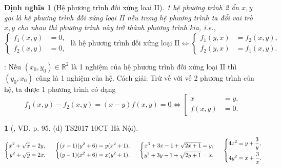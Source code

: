 \documentclass{article}
\newtheorem{baitoan}{}
\newtheorem{dinhnghia}{Định nghĩa}
\begin{document}
\begin{dinhnghia}[Hệ phương trình đối xứng loại II]
	1 hệ phương trình 2 ẩn $x,y$ gọi là {hệ phương trình đối xứng loại II} nếu trong hệ phương trình ta đổi vai trò $x,y$ cho nhau thì phương trình này trở thành phương trình kia, i.e.,
	\begin{equation*}
		\left\{\begin{split}
			f_1(x,y) &= 0,\\
			f_2(x,y) &= 0,
		\end{split}\right.\mbox{ là hệ phương trình đối xứng loại II}\Leftrightarrow\left\{\begin{split}
			f_1(y,x) &= f_2(x,y),\\
			f_2(y,x) &= f_1(x,y).
		\end{split}\right.
	\end{equation*}
\end{dinhnghia}
: Nếu $(x_0,y_0)\in\mathbb{R}^2$ là 1 nghiệm của hệ phương trình đối xứng loại II thì $(y_0,x_0)$ cũng là 1 nghiệm của hệ. {\sf Cách giải}: Trừ vế với vế 2 phương trình của hệ, ta được 1 phương trình có dạng
\begin{equation*}
	f_1(x,y) - f_2(x,y) = (x - y)f(x,y) = 0\Leftrightarrow\left[\begin{split}
		x &= y,\\
		f(x,y) &= 0.
	\end{split}\right.
\end{equation*}

\begin{baitoan}[\cite{Kien_dai_so_9}, VD, p. 95, (d) TS2017 10CT Hà Nội]
	\begin{equation*}
		\left\{\begin{split}
			x^2 + \sqrt{x} &= 2y,\\
			y^2 + \sqrt{y} &= 2x.
		\end{split}\right.\hspace{5mm}\left\{\begin{split}
			(x - 1)(y^2 + 6) &= y(x^2 + 1),\\
			(y - 1)(x^2 + 6) &= x(y^2 + 1).
		\end{split}\right.\hspace{5mm}\left\{\begin{split}
			x^3 + 3x - 1 + \sqrt{2x + 1} &= y,\\
			y^3 + 3y - 1 + \sqrt{2y + 1} &= x.
		\end{split}\right.\hspace{5mm}\left\{\begin{split}
			4x^2 &= y + \frac{3}{y},\\
			4y^2 &= x + \frac{3}{x}.
		\end{split}\right.
	\end{equation*}
\end{baitoan}
\end{document}
